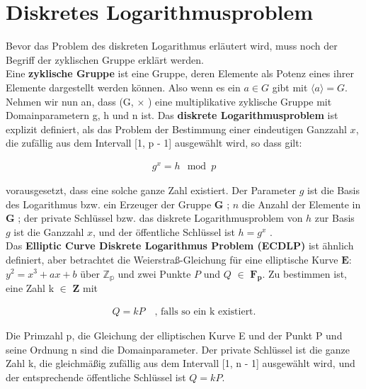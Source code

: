 \section{Diskretes Logarithmusproblem }

Bevor das Problem des diskreten Logarithmus erläutert wird, muss noch der Begriff der zyklischen Gruppe erklärt werden.\\ 

Eine \textbf{zyklische Gruppe} ist eine Gruppe, deren Elemente
als Potenz eines ihrer Elemente dargestellt werden können. Also wenn es ein \(a \in \textit{G}\) gibt mit \(\langle a \rangle = G\).\\ 

Nehmen wir nun an, dass (G, $ \times $ ) eine multiplikative zyklische Gruppe mit Domainparametern g, h und n ist.   
Das \textbf{diskrete Logarithmusproblem} ist explizit definiert, als das Problem der Bestimmung einer eindeutigen Ganzzahl $ x $, die zufällig aus dem Intervall [1, p - 1] ausgewählt wird, so dass gilt:
\begin{ceqn}

\begin{align*}
                g^x = h \mod p
\end{align*}

\end{ceqn}
vorausgesetzt, dass eine solche ganze Zahl existiert.
Der Parameter $ g $ ist die Basis des Logarithmus bzw. ein Erzeuger der Gruppe $ \mathbf{G} $ ; $ n $ die Anzahl der Elemente in $ \mathbf{G} $ ; der private Schlüssel bzw. das diskrete Logarithmusproblem von $ h $ zur Basis $ g $  ist die Ganzzahl $ x $, und der öffentliche Schlüssel ist   $ h = g^x $ \cite{Hankerson}. \\


Das \textbf{Elliptic Curve Diskrete Logarithmus Problem (ECDLP)} ist ähnlich definiert, aber betrachtet die Weierstraß-Gleichung für eine elliptische Kurve $ \mathbf{E:} $ $ y^2 = x^3 + ax + b $ über $ \mathbb{Z_p} $ und zwei Punkte $ P $ und $ Q $ $\in $ $ \mathbf{F_p} $.  Zu bestimmen ist, eine Zahl k $ \in $ $ \mathbf{Z} $ mit

\begin{ceqn}
\begin{align*}
      Q = kP  \quad \text{, falls so ein k existiert.}
\end{align*}
   
\end{ceqn}

Die Primzahl p, die Gleichung der elliptischen Kurve E und der Punkt P und seine Ordnung n sind die Domainparameter. Der private Schlüssel ist die ganze Zahl k, die gleichmäßig zufällig aus dem Intervall [1, n - 1] ausgewählt wird, und der entsprechende öffentliche Schlüssel ist $ Q = kP $.

